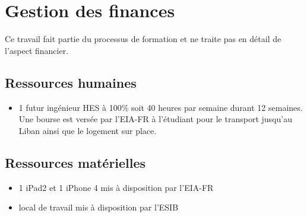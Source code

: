 \section{Gestion des finances}
Ce travail fait partie du processus de formation et ne traite pas en détail de l'aspect financier.
\subsection{Ressources humaines}
\begin{itemize}
	\item 1 futur ingénieur HES  à 100\%  soit 40 heures par semaine durant 12 semaines. Une bourse est versée par  l'\gls{EIA-FR} à l'étudiant pour le transport jusqu'au Liban ainsi que le logement sur place. 
\end{itemize}
\subsection{Ressources matérielles}
\begin{itemize}
	\item 1 iPad2 et 1 iPhone 4  mis à disposition par l'\gls{EIA-FR}
	\item local de travail mis à disposition par l'\gls{ESIB}
\end{itemize}